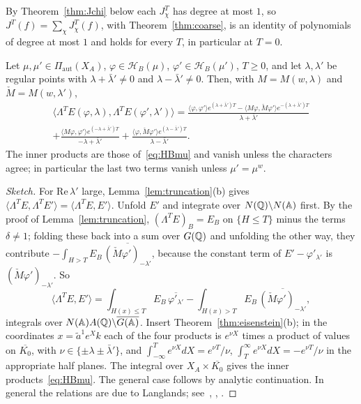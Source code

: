 By Theorem~\ref{thm:Jchi} below each $J^T_\chi$ has
degree at most $1$, so $J^T(f)=\sum_\chi J^T_\chi(f)$, with
Theorem~\ref{thm:coarse}, is an identity of polynomials of degree at most
$1$ and holds for every $T$, in particular at $T=0$.

\begin{lemma}\label{lem:MS}
Let $\mu,\mu'\in\Pi_{\mathrm{aut}}(X_A)$, $\varphi\in\mathcal H_B(\mu)$,
$\varphi'\in\mathcal H_B(\mu')$, $T\ge0$, and let $\lambda,\lambda'$ be
regular points with $\lambda+\bar\lambda'\ne0$ and
$\lambda-\bar\lambda'\ne0$. Then, with $M=M(w,\lambda)$ and
$\check M=M(w,\lambda')$,
\begin{multline}\label{eq:MS}
\bigl\langle\Lambda^TE(\varphi,\lambda),\Lambda^TE(\varphi',\lambda')
\bigr\rangle
=\frac{\langle\varphi,\varphi'\rangle e^{(\lambda+\bar\lambda')T}
-\langle M\varphi,\check M\varphi'\rangle e^{-(\lambda+\bar\lambda')T}}
{\lambda+\bar\lambda'}\\
+\frac{\langle M\varphi,\varphi'\rangle e^{(-\lambda+\bar\lambda')T}}
{-\lambda+\bar\lambda'}
+\frac{\langle\varphi,\check M\varphi'\rangle e^{(\lambda-\bar\lambda')T}}
{\lambda-\bar\lambda'} .
\end{multline}
The inner products are those of~\eqref{eq:HBmu} and vanish unless the
characters agree; in particular the last two terms vanish unless
$\mu'=\mu^w$.
\end{lemma}

\begin{proof}[Sketch]
For $\mathrm{Re}\,\lambda'$ large, Lemma~\ref{lem:truncation}(b) gives
$\langle\Lambda^TE,\Lambda^TE'\rangle=\langle\Lambda^TE,E'\rangle$. Unfold
$E'$ and integrate over $N(\mathbb{Q})\backslash N(\mathbb{A})$ first. By the proof of
Lemma~\ref{lem:truncation}, $(\Lambda^TE)_B=E_B$ on $\{H\le T\}$ minus the
terms $\delta\ne1$; folding these back into a sum over $G(\mathbb{Q})$ and
unfolding the other way, they contribute
$-\int_{H>T}E_B\,\overline{(\check M\varphi')_{-\lambda'}}$, because the
constant term of $E'-\varphi'_{\lambda'}$ is $(\check M\varphi')_{-\lambda'}$.
So
\[
\langle\Lambda^TE,E'\rangle=\int_{H(x)\le T}E_B\,\overline{\varphi'_{\lambda'}}
-\int_{H(x)>T}E_B\,\overline{(\check M\varphi')_{-\lambda'}},
\]
integrals over $N(\mathbb{A})A(\mathbb{Q})\backslash\overline{G(\mathbb{A})}$. Insert
Theorem~\ref{thm:eisenstein}(b); in the coordinates $x=\tilde a^1e^Xk$ each
of the four products is $e^{\nu X}$ times a product of values on
$\overline{K_0}$, with $\nu\in\{\pm\lambda\pm\bar\lambda'\}$, and
$\int_{-\infty}^Te^{\nu X}dX=e^{\nu T}/\nu$, $\int_T^\infty e^{\nu X}dX=
-e^{\nu T}/\nu$ in the appropriate half planes. The integral over
$X_A\times\overline{K_0}$ gives the inner products~\eqref{eq:HBmu}. The
general case follows by analytic continuation. In general the relations
are due to Langlands; see~\cite[\S4]{Ar80}, \cite{MW95}, \cite{Li13}.
\end{proof}

